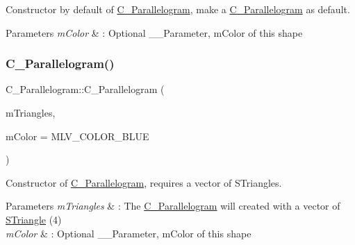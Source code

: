 Constructor by default of \hyperlink{classParallelogram}{C_Parallelogram}, make a \hyperlink{classParallelogram}{C_Parallelogram} as default.


\begin{DoxyParams}{Parameters}
{\em mColor} & \+: Optional __Parameter, mColor of this shape \\
\hline
\end{DoxyParams}
\mbox{\label{classParallelogram_ac60d6fc9e306b202e9c679d170d6d063}} 
\subsubsection{\texorpdfstring{C_Parallelogram()}{C_Parallelogram()}\hspace{0.1cm}{\footnotesize\ttfamily [2/3]}}
{\footnotesize\ttfamily C_Parallelogram\+::\+C_Parallelogram (\begin{DoxyParamCaption}\item[{const std\+::vector$<$ \hyperlink{classSTriangle}{S\+Triangle} $>$ \&}]{mTriangles,  }\item[{M\+L\+V\+\_\+\+Color}]{mColor = {\ttfamily MLV\+\_\+COLOR\+\_\+BLUE} }\end{DoxyParamCaption})\hspace{0.3cm}{\ttfamily [explicit]}}



Constructor of \hyperlink{classParallelogram}{C_Parallelogram}, requires a vector of S\+Triangles.


\begin{DoxyParams}{Parameters}
{\em mTriangles} & \+: The \hyperlink{classParallelogram}{C_Parallelogram} will created with a vector of \hyperlink{classSTriangle}{S\+Triangle} (4) \\
\hline
{\em mColor} & \+: Optional __Parameter, mColor of this shape \\
\hline
\end{DoxyParams}
\mbox{\label{classParallelogram_aeed0c83e942a4869b79d4baab00c2874}} 
